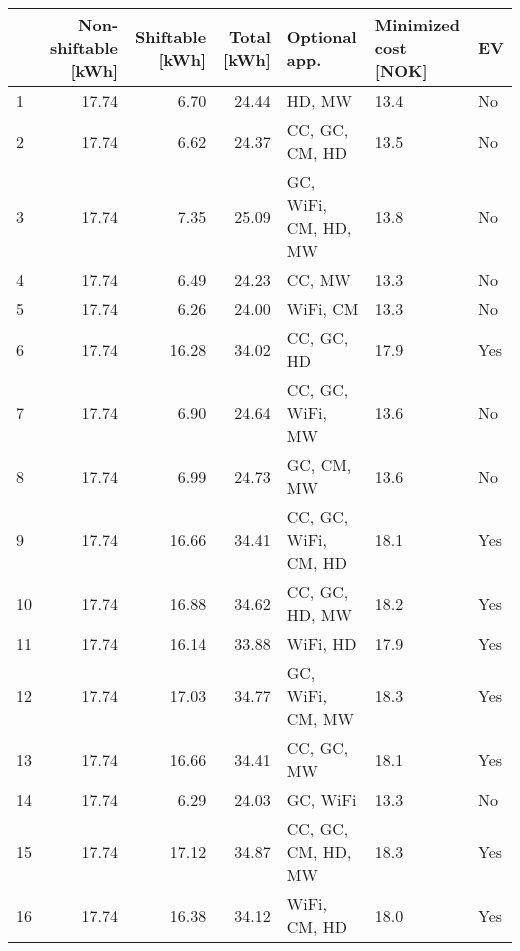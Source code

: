 \begin{tabular}{lrrrlll}
\toprule
{} &  Non-shiftable [kWh] &  Shiftable [kWh] &  Total [kWh] &         Optional app. & Minimized cost [NOK] &   EV \\
\midrule
1  &                17.74 &             6.70 &        24.44 &                HD, MW &                 13.4 &   No \\
2  &                17.74 &             6.62 &        24.37 &        CC, GC, CM, HD &                 13.5 &   No \\
3  &                17.74 &             7.35 &        25.09 &  GC, WiFi, CM, HD, MW &                 13.8 &   No \\
4  &                17.74 &             6.49 &        24.23 &                CC, MW &                 13.3 &   No \\
5  &                17.74 &             6.26 &        24.00 &              WiFi, CM &                 13.3 &   No \\
6  &                17.74 &            16.28 &        34.02 &            CC, GC, HD &                 17.9 &  Yes \\
7  &                17.74 &             6.90 &        24.64 &      CC, GC, WiFi, MW &                 13.6 &   No \\
8  &                17.74 &             6.99 &        24.73 &            GC, CM, MW &                 13.6 &   No \\
9  &                17.74 &            16.66 &        34.41 &  CC, GC, WiFi, CM, HD &                 18.1 &  Yes \\
10 &                17.74 &            16.88 &        34.62 &        CC, GC, HD, MW &                 18.2 &  Yes \\
11 &                17.74 &            16.14 &        33.88 &              WiFi, HD &                 17.9 &  Yes \\
12 &                17.74 &            17.03 &        34.77 &      GC, WiFi, CM, MW &                 18.3 &  Yes \\
13 &                17.74 &            16.66 &        34.41 &            CC, GC, MW &                 18.1 &  Yes \\
14 &                17.74 &             6.29 &        24.03 &              GC, WiFi &                 13.3 &   No \\
15 &                17.74 &            17.12 &        34.87 &    CC, GC, CM, HD, MW &                 18.3 &  Yes \\
16 &                17.74 &            16.38 &        34.12 &          WiFi, CM, HD &                 18.0 &  Yes \\

\end{tabular}
